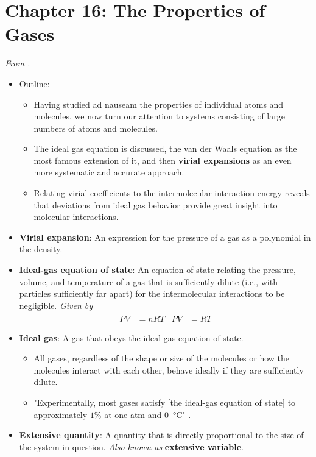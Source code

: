 \documentclass[../notes.tex]{subfiles}
\begin{document}
\section{Chapter 16: The Properties of Gases}
\emph{From \textcite{bib:McQuarrieSimon}.}
\begin{itemize}
    \item {}Outline:
    \begin{itemize}
        \item Having studied ad nauseam the properties of individual atoms and molecules, we now turn our attention to systems consisting of large numbers of atoms and molecules.
        \item The ideal gas equation is discussed, the van der Waals equation as the most famous extension of it, and then \textbf{virial expansions} as an even more systematic and accurate approach.
        \item Relating virial coefficients to the intermolecular interaction energy reveals that deviations from ideal gas behavior provide great insight into molecular interactions.
    \end{itemize}
    \item \textbf{Virial expansion}: An expression for the pressure of a gas as a polynomial in the density.
    \item \textbf{Ideal-gas equation of state}: An equation of state relating the pressure, volume, and temperature of a gas that is sufficiently dilute (i.e., with particles sufficiently far apart) for the intermolecular interactions to be negligible. \emph{Given by}
    \begin{align*}
        PV &= nRT&
        P\overline{V} &= RT
    \end{align*}
    \item \textbf{Ideal gas}: A gas that obeys the ideal-gas equation of state.
    \begin{itemize}
        \item All gases, regardless of the shape or size of the molecules or how the molecules interact with each other, behave ideally if they are sufficiently dilute.
        \item "Experimentally, most gases satisfy [the ideal-gas equation of state] to approximately $1\%$ at one atm and \SI{0}{\celsius}" \parencite[638]{bib:McQuarrieSimon}.
    \end{itemize}
    \item \textbf{Extensive quantity}: A quantity that is directly proportional to the size of the system in question. \emph{Also known as} \textbf{extensive variable}.

\end{itemize}
\end{document}
